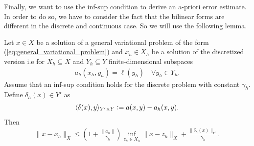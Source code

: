 \documentclass[../master_thesis.tex]{subfiles}
\begin{document}
Finally, we want to use the inf-sup condition to derive an a-priori error estimate. 
In order to do so, we have to consider the fact that the bilinear forms 
are different in the discrete and continuous case. So we will use the following lemma.
\begin{lemma}\label{lem:a_priori_estimate_from_infsup}
    Let $x \in X$ be a solution of a general variational problem of the form (\ref{eq:general_variational_problem}) 
    and $x_h \in X_h$ be a solution of the discretized version i.e for $X_h \subseteq X$ 
    and $ Y_h \subseteq Y$ finite-dimensional subspaces
    \begin{align*}
        a_h(x_h,y_h) = \ell(y_h) \quad \forall y_h \in Y_h.
    \end{align*}
    Assume that an inf-sup condition holds for the discrete problem with constant 
    $\gamma_h$.
    Define $\delta_h(x) \in Y'$ as 
    \begin{align*}
        \langle \delta(x), y \rangle_{Y'\times Y} 
        \vcentcolon= a(x,y) - a_h(x,y).
    \end{align*}
    Then
    \begin{align*}
        \lVert x - x_h \rVert _X 
        \leq \left( 1 + \frac{\lVert a_h \rVert}{\gamma_h} \right) 
            \inf_{z_h \in X_h} \lVert x - z_h\rVert _X + \frac{\lVert \delta_h(x) \rVert _{Y'}}{\gamma_h}.
    \end{align*}
\end{lemma}
\end{document}
